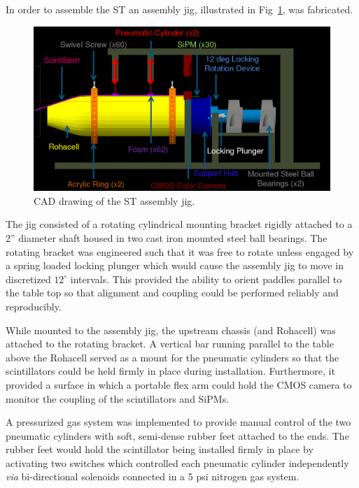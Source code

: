 In order to assemble the ST an assembly jig, illustrated in Fig~\ref{fig:ajcaddrawing}, was fabricated.  
	\begin{figure}[!htb]
		\centering
		\includegraphics[width=1.0\columnwidth]{fabrication/figs/aj_cad_drawing}
		\caption{CAD drawing of the ST assembly jig.}
		\label{fig:ajcaddrawing}
	\end{figure}
The jig consisted of a rotating cylindrical mounting bracket rigidly attached to a 2'' diameter shaft housed in two cast iron mounted steel ball bearings.  The rotating bracket was engineered such that it was free to rotate unless engaged by a spring loaded locking plunger which would cause the assembly jig to move in discretized $12^{\circ}$ intervals.  This provided the ability to orient paddles parallel to the table top so that alignment and coupling could be performed reliably and reproducibly.

While mounted to the assembly jig, the upstream chassis (and Rohacell) was attached to the rotating bracket.  A vertical bar running parallel to the table above the Rohacell served as a mount for the pneumatic cylinders so that the scintillators could be held firmly in place during installation.  Furthermore, it provided a surface in which a portable flex arm could hold the CMOS camera to monitor the coupling of the scintillators and SiPMs.

A pressurized gas system was implemented to provide manual control of the two pneumatic cylinders with soft, semi-dense rubber feet attached to the ends.  The rubber feet would hold the scintillator being installed firmly in place by activating two switches which controlled each pneumatic cylinder independently \textit{via} bi-directional solenoids connected in a 5 psi nitrogen gas system.

